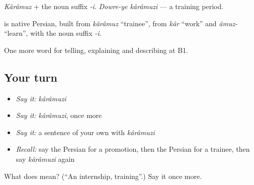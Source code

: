 \emph{Kârâmuz} + the noun suffix \emph{-i}. \emph{Dowre-ye kârâmuzi} — a training period.

\begin{cousinweb}
\textbf{} is native Persian, built from \emph{kârâmuz} \textquotedblleft{}trainee\textquotedblright{}, from \emph{kâr} \textquotedblleft{}work\textquotedblright{} and \emph{âmuz-} \textquotedblleft{}learn\textquotedblright{}, with the noun suffix \emph{-i}.
\end{cousinweb}

\begin{grammarlens}[title={What you've built}]
One more word for telling, explaining and describing at B1.
\end{grammarlens}

\subsection*{Your turn}
\begin{itemize}
\raggedright
  \item \emph{Say it:} \emph{kârâmuzi}
  \item \emph{Say it:} \emph{kârâmuzi}, once more
  \item \emph{Say it:} a sentence of your own with \emph{kârâmuzi}
  \item \emph{Recall:} say the Persian for a promotion, then the Persian for a trainee, then say \emph{kârâmuzi} again
\end{itemize}

\begin{tcolorbox}[breakable,colback=teal!4,colframe=teal!35!black,title={Before you move on}]
What does  mean? (\textquotedblleft{}An internship, training\textquotedblright{}.) Say it once more.
\end{tcolorbox}

